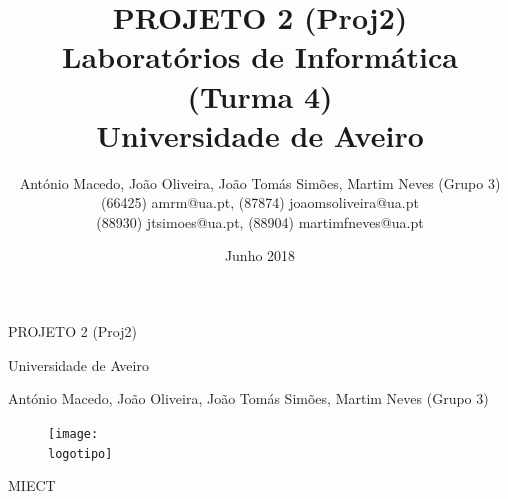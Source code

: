 \documentclass[a4paper]{report}
\begin{document}
\def\titulo{PROJETO 2 (Proj2)}
\def\data{Junho 2018}
\def\autores{António Macedo, João Oliveira, João Tomás Simões, Martim Neves (Grupo 3)}
\def\autorescontactos{(66425) amrm@ua.pt, (87874) joaomsoliveira@ua.pt}
\def\autorescontacto{(88930) jtsimoes@ua.pt, (88904) martimfneves@ua.pt}
\def\versao{MIECT}
\def\departamento{Laboratórios de Informática (Turma 4)}
\def\empresa{Universidade de Aveiro}
\def\logotipo{ua.pdf}

\begin{titlepage}

\begin{center}

\vspace*{50mm}

{\Huge \titulo}\\ 

\vspace{10mm}

{\Large \empresa}\\

\vspace{10mm}

{\LARGE \autores}\\ 

\vspace{30mm}

\begin{figure}[h]
\center
\texttt{[image: \\logotipo]}
\end{figure}

\vspace{30mm}
\end{center}

\begin{flushright}
\versao
\end{flushright}
\end{titlepage}

\title{
{\Huge\textbf{\titulo}}\\
\vspace{3mm}
{\Large \departamento\\ \empresa}
}

\author{
\autores \\
\autorescontactos \\
\autorescontacto
}

\date{\data}

\maketitle
\end{document}
